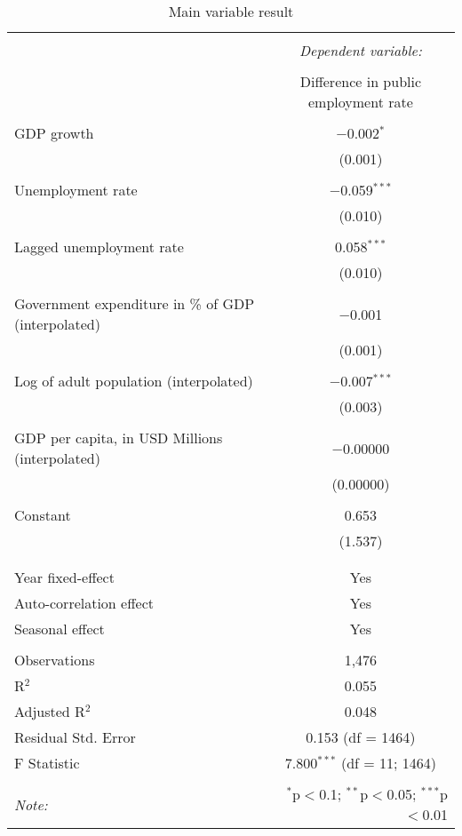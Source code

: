 
\begin{table}[!htbp] \centering 
  \caption{Main variable result} 
  \label{} 
\begin{tabular}{@{\extracolsep{5pt}}lc} 
\\[-1.8ex]\hline 
\hline \\[-1.8ex] 
 & \multicolumn{1}{c}{\textit{Dependent variable:}} \\ 
\cline{2-2} 
\\[-1.8ex] & Difference in public employment rate \\ 
\hline \\[-1.8ex] 
 GDP growth & $-$0.002$^{*}$ \\ 
  & (0.001) \\ 
  & \\ 
 Unemployment rate & $-$0.059$^{***}$ \\ 
  & (0.010) \\ 
  & \\ 
 Lagged unemployment rate & 0.058$^{***}$ \\ 
  & (0.010) \\ 
  & \\ 
 Government expenditure in \% of GDP (interpolated) & $-$0.001 \\ 
  & (0.001) \\ 
  & \\ 
 Log of adult population (interpolated) & $-$0.007$^{***}$ \\ 
  & (0.003) \\ 
  & \\ 
 GDP per capita, in USD Millions (interpolated) & $-$0.00000 \\ 
  & (0.00000) \\ 
  & \\ 
 Constant & 0.653 \\ 
  & (1.537) \\ 
  & \\ 
\hline \\[-1.8ex] 
Year fixed-effect & Yes \\ 
Auto-correlation effect & Yes \\ 
Seasonal effect & Yes \\ 
\hline \\[-1.8ex] 
Observations & 1,476 \\ 
R$^{2}$ & 0.055 \\ 
Adjusted R$^{2}$ & 0.048 \\ 
Residual Std. Error & 0.153 (df = 1464) \\ 
F Statistic & 7.800$^{***}$ (df = 11; 1464) \\ 
\hline 
\hline \\[-1.8ex] 
\textit{Note:}  & \multicolumn{1}{r}{$^{*}$p$<$0.1; $^{**}$p$<$0.05; $^{***}$p$<$0.01} \\ 
\end{tabular} 
\end{table} 
